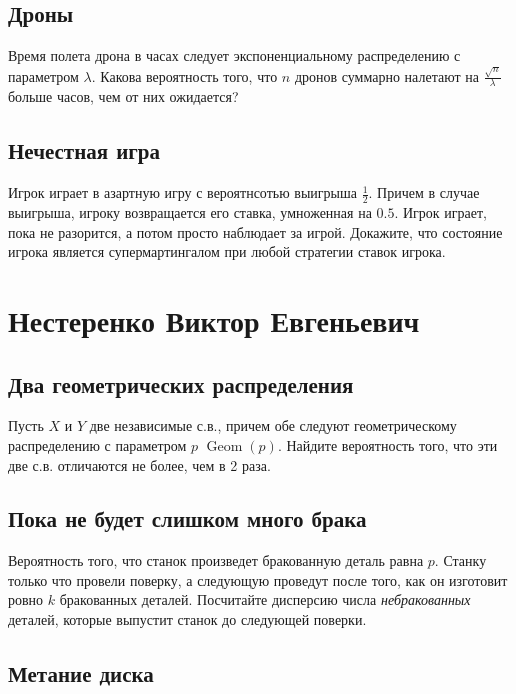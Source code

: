 \documentclass[12pt]{article}
\DeclareMathOperator{\Geom}{Geom}
\begin{document}
\subsection{Дроны}

Время полета дрона в часах следует экспоненциальному распределению с параметром $\lambda$. Какова вероятность того, что $n$ дронов суммарно налетают на $\frac{\sqrt{n}}{\lambda}$ больше часов, чем от них ожидается?



\subsection{Нечестная игра}

Игрок играет в азартную игру с вероятнсотью выигрыша $\frac{1}{2}$. Причем в случае выигрыша, игроку возвращается его ставка, умноженная на $0.5$. Игрок играет, пока не разорится, а потом просто наблюдает за игрой. Докажите, что состояние игрока является супермартингалом при любой стратегии ставок игрока.



\newpage
\section{Нестеренко Виктор Евгеньевич}

\subsection{Два геометрических распределения}

Пусть $X$ и $Y$ две независимые с.в., причем обе следуют геометрическому распределению с параметром $p$ $\Geom(p)$. Найдите вероятность того, что эти две с.в. отличаются не более, чем в 2 раза.



\subsection{Пока не будет слишком много брака}

Вероятность того, что станок произведет бракованную деталь равна $p$. Станку только что провели поверку, а следующую проведут после того, как он изготовит ровно $k$ бракованных деталей. Посчитайте дисперсию числа \emph{небракованных} деталей, которые выпустит станок до следующей поверки.



\subsection{Метание диска}
\end{document}

